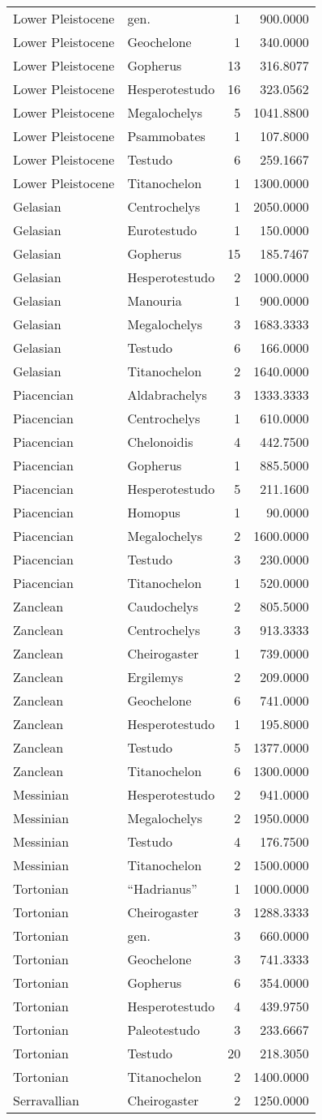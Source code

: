 \begin{longtable}[]{@{}llrr@{}}
	Lower Pleistocene & gen. & 1 & 900.0000\tabularnewline
	Lower Pleistocene & Geochelone & 1 & 340.0000\tabularnewline
	Lower Pleistocene & Gopherus & 13 & 316.8077\tabularnewline
	Lower Pleistocene & Hesperotestudo & 16 & 323.0562\tabularnewline
	Lower Pleistocene & Megalochelys & 5 & 1041.8800\tabularnewline
	Lower Pleistocene & Psammobates & 1 & 107.8000\tabularnewline
	Lower Pleistocene & Testudo & 6 & 259.1667\tabularnewline
	Lower Pleistocene & Titanochelon & 1 & 1300.0000\tabularnewline
	Gelasian & Centrochelys & 1 & 2050.0000\tabularnewline
	Gelasian & Eurotestudo & 1 & 150.0000\tabularnewline
	Gelasian & Gopherus & 15 & 185.7467\tabularnewline
	Gelasian & Hesperotestudo & 2 & 1000.0000\tabularnewline
	Gelasian & Manouria & 1 & 900.0000\tabularnewline
	Gelasian & Megalochelys & 3 & 1683.3333\tabularnewline
	Gelasian & Testudo & 6 & 166.0000\tabularnewline
	Gelasian & Titanochelon & 2 & 1640.0000\tabularnewline
	Piacencian & Aldabrachelys & 3 & 1333.3333\tabularnewline
	Piacencian & Centrochelys & 1 & 610.0000\tabularnewline
	Piacencian & Chelonoidis & 4 & 442.7500\tabularnewline
	Piacencian & Gopherus & 1 & 885.5000\tabularnewline
	Piacencian & Hesperotestudo & 5 & 211.1600\tabularnewline
	Piacencian & Homopus & 1 & 90.0000\tabularnewline
	Piacencian & Megalochelys & 2 & 1600.0000\tabularnewline
	Piacencian & Testudo & 3 & 230.0000\tabularnewline
	Piacencian & Titanochelon & 1 & 520.0000\tabularnewline
	Zanclean & Caudochelys & 2 & 805.5000\tabularnewline
	Zanclean & Centrochelys & 3 & 913.3333\tabularnewline
	Zanclean & Cheirogaster & 1 & 739.0000\tabularnewline
	Zanclean & Ergilemys & 2 & 209.0000\tabularnewline
	Zanclean & Geochelone & 6 & 741.0000\tabularnewline
	Zanclean & Hesperotestudo & 1 & 195.8000\tabularnewline
	Zanclean & Testudo & 5 & 1377.0000\tabularnewline
	Zanclean & Titanochelon & 6 & 1300.0000\tabularnewline
	Messinian & Hesperotestudo & 2 & 941.0000\tabularnewline
	Messinian & Megalochelys & 2 & 1950.0000\tabularnewline
	Messinian & Testudo & 4 & 176.7500\tabularnewline
	Messinian & Titanochelon & 2 & 1500.0000\tabularnewline
	Tortonian & ``Hadrianus'' & 1 & 1000.0000\tabularnewline
	Tortonian & Cheirogaster & 3 & 1288.3333\tabularnewline
	Tortonian & gen. & 3 & 660.0000\tabularnewline
	Tortonian & Geochelone & 3 & 741.3333\tabularnewline
	Tortonian & Gopherus & 6 & 354.0000\tabularnewline
	Tortonian & Hesperotestudo & 4 & 439.9750\tabularnewline
	Tortonian & Paleotestudo & 3 & 233.6667\tabularnewline
	Tortonian & Testudo & 20 & 218.3050\tabularnewline
	Tortonian & Titanochelon & 2 & 1400.0000\tabularnewline
	Serravallian & Cheirogaster & 2 & 1250.0000\tabularnewline

\end{longtable}
